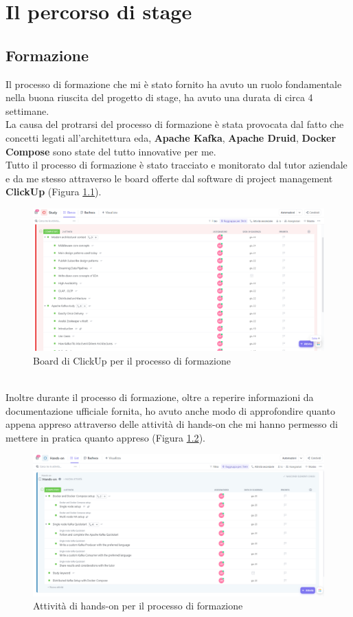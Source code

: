 \chapter{Il percorso di stage }\label{cap:Il_percorso}
\section{Formazione}
Il processo di formazione che mi è stato fornito ha avuto un ruolo fondamentale nella buona riuscita del progetto di stage, 
ha avuto una durata di circa 4 settimane. \\
La causa del protrarsi del processo di formazione è stata provocata dal fatto che concetti legati all'architettura \gls{eda}{},
\textbf{Apache Kafka}, \textbf{Apache Druid}, \textbf{Docker Compose} sono state del tutto innovative per me.\\
Tutto il processo di formazione è stato tracciato e monitorato dal tutor aziendale e da me stesso attraverso le \gls{board}{} offerte 
dal software di project management \textbf{ClickUp} (Figura \ref{cap:ClickUp}).\\
\begin{figure}[h]
    \centering
    \includegraphics[width=1\textwidth]{images/percorso/formazione.png}
    \caption{Board di ClickUp per il processo di formazione}
    \label{cap:ClickUp}
\end{figure}
\pagebreak
\\
Inoltre durante il processo di formazione, oltre a reperire informazioni da documentazione ufficiale fornita, ho avuto anche modo 
di approfondire quanto appena appreso attraverso delle attività di \gls{hands-on}{} che mi hanno permesso di mettere in pratica quanto appreso (Figura \ref{cap:Hands-on}).
\begin{figure}[h]
    \centering
    \includegraphics[width=1\textwidth]{images/percorso/hands_on.png}
    \caption{Attività di hands-on per il processo di formazione}
    \label{cap:Hands-on}
\end{figure}
